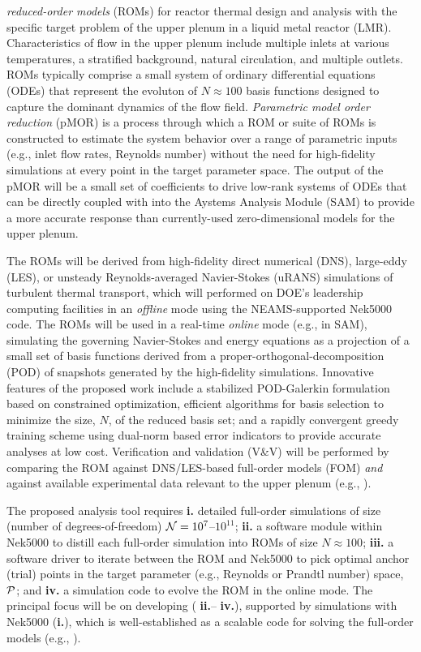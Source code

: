 {\em reduced-order
models} (ROMs) for reactor thermal design and analysis with the specific target
problem of the upper plenum in a liquid metal reactor (LMR).  Characteristics
of flow in the upper plenum include multiple inlets at various temperatures, a
stratified background, natural circulation, and multiple outlets.  
   ROMs typically comprise a small system of ordinary differential equations
(ODEs) that represent the evoluton of $N \approx 100$ basis functions designed
to capture the dominant dynamics of the flow field.
   {\em Parametric model order reduction} (pMOR) is a process through which
a ROM or suite of ROMs is constructed to estimate the system behavior 
over a range of parametric inputs (e.g., inlet flow rates, Reynolds number)
without the need for high-fidelity simulations at every point in the target
parameter space.  The output of the pMOR will be a small set 
of coefficients to drive low-rank systems of ODEs that can be directly coupled
with into the Aystems Analysis Module (SAM) to provide a more accurate response
than currently-used zero-dimensional models for the upper plenum.

The ROMs will be derived from high-fidelity direct numerical
(DNS), large-eddy (LES), or unsteady Reynolds-averaged Navier-Stokes (uRANS)
simulations of turbulent thermal transport, which will performed on DOE's
leadership computing facilities in an {\em offline} mode using the
NEAMS-supported Nek5000 code.  The ROMs will be used in a real-time {\em
online} mode (e.g., in SAM), simulating the governing Navier-Stokes and energy
equations as a projection of a small set of basis functions derived from a
proper-orthogonal-decomposition (POD) of snapshots generated by the
high-fidelity simulations.  Innovative features of the proposed work include a
stabilized POD-Galerkin formulation based on constrained optimization,
efficient algorithms for basis selection to minimize the size, $N$, of the
reduced basis set;  and a rapidly convergent greedy training scheme using
dual-norm based error indicators to provide accurate analyses at low cost.  
Verification and validation (V\&V) will be performed by comparing the ROM
against DNS/LES-based full-order models (FOM) {\em and} against available
experimental data relevant to the upper plenum (e.g., \cite{lomperski17}).


The proposed analysis tool requires 
 \textbf{i.} detailed full-order simulations of size (number of degrees-of-freedom)
${\cal N}=10^7$--$10^{11}$;
 \textbf{ii.} a software module within Nek5000 to distill each full-order
simulation into ROMs of size $N \approx 100$;
 \textbf{iii.} a software driver to iterate between the ROM and Nek5000 to 
pick optimal anchor (trial) points in the target parameter 
(e.g., Reynolds or Prandtl number) space, $\mathcal{P}$;
and
 \textbf{iv.} a simulation code to evolve the ROM in the online mode. 
The principal focus will be on developing ( \textbf{ii.}-- \textbf{iv.}), supported by
simulations with Nek5000 (\textbf{i.}), which is well-established as a scalable
code for solving the full-order models (e.g., \cite{merzari11b,merzari15a}). 

